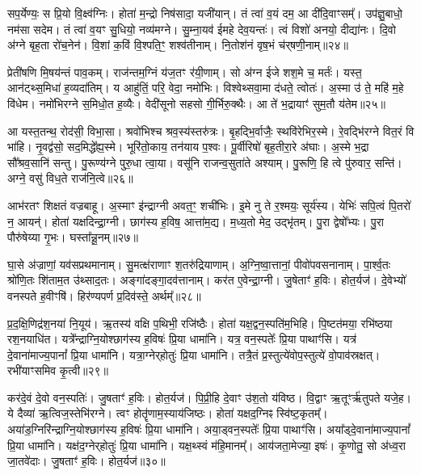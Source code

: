 सप॒र्येण्यः॒ स प्रि॒यो वि॒क्ष्व॑ग्निः।
होता॑ म॒न्द्रो निष॑सादा॒ यजी॑यान्।
तं त्वा॑ व॒यं दम॒ आ दी॑दि॒वाꣳसम्᳚।
उप॑ज्ञु॒बाधो॒ नम॑सा सदेम।
तं त्वा॑ व॒यꣳ सु॒धियो॒ नव्य॑मग्ने।
सु॒म्ना॒यव॑ ईमहे देव॒यन्तः॑।
त्वं विशो॑ अनयो॒ दीद्या॑नः।
दि॒वो अ॑ग्ने बृह॒ता रो॑च॒नेन॑।
वि॒शां क॒विं वि॒श्पति॒ꣳ॒ शश्व॑तीनाम्।
नि॒तोश॑नं वृष॒भं च॑र्‌\mbox{}षणी॒नाम्॥२४॥\ip

प्रेती॑षणि मि॒षय॑न्तं पाव॒कम्।
राज॑न्तम॒ग्निं य॑ज॒तꣳ र॑यी॒णाम्।
सो अ॑ग्न ईजे शश॒मे च॒ मर्तः॑।
यस्त॒ आन॑ट्थ्स॒मिधा॑ ह॒व्यदा॑तिम्।
य आहु॑तिं॒ परि॒ वेदा॒ नमो॑भिः।
विश्वेथ्सवा॒मा द॑धते॒ त्वोतः॑।
अ॒स्मा उ॑ ते॒ महि॑ म॒हे वि॑धेम।
नमो॑भिरग्ने स॒मिधो॒त ह॒व्यैः।
वेदी॑सूनो सहसो गी॒र्भिरु॒क्थैः।
आ ते॑ भ॒द्रायाꣳ॑ सुम॒तौ य॑तेम॥२५॥\ip

आ यस्त॒तन्थ॒ रोद॑सी॒ विभा॒सा।
श्रवो॑भिश्च श्रव॒स्य॑स्तरु॑त्रः।
बृ॒हद्भि॒र्वाजैः॒ स्थवि॑रेभिर॒स्मे।
रे॒वद्भि॑रग्ने वित॒रं वि भा॑हि।
नृ॒वद्व॑सो॒ सद॒मिद्धे᳚ह्य॒स्मे।
भूरि॑तो॒काय॒ तन॑याय प॒श्वः।
पू॒र्वीरिषो॑ बृह॒तीरा॒रे अ॑घाः।
अ॒स्मे भ॒द्रा सौ᳚श्रव॒सानि॑ सन्तु।
पु॒रूण्य॑ग्ने पुरु॒धा त्वा॒या।
वसू॑नि राजन्व॒सुता॑ते अश्याम्।
पु॒रूणि॒ हि त्वे पु॑रुवार॒ सन्ति॑।
अग्ने॒ वसु॑ विध॒ते राज॑नि॒त्वे॥२६॥\ip\anuvakamend[जा॒गृ॒वाꣳसो॒ अनु॑ग्म॒न्मानु॑षाणाञ्चर्‌\mbox{}षणी॒नां य॑तेमाश्या॒न्द्वे च॑]

आभ॑रतꣳ शिक्षतं वज्रबाहू।
अ॒स्माꣳ इ॑न्द्राग्नी अवत॒ꣳ॒ शची॑भिः।
इ॒मे नु ते र॒श्मयः॒ सूर्य॑स्य।
येभिः॑ सपि॒त्वं पि॒तरो॑ न॒ आयन्॑।
होता॑ यक्षदिन्द्रा॒ग्नी।
छाग॑स्य ह॒विष॒ आत्ता॑म॒द्य।
म॒ध्य॒तो मेद॒ उद्भृ॑तम्।
पु॒रा द्वेषो᳚भ्यः।
पु॒रा पौरु॑षेय्या गृ॒भः।
घस्ता᳚न्नू॒नम्॥२७॥\ip

घा॒से अ॑ज्राणां॒ यव॑सप्रथमानाम्।
सु॒मत्क्ष॑राणाꣳ श॒तरु॑द्रि\-याणाम्।
अ॒ग्नि॒ष्वा॒त्तानां॒ पीवो॑पवसनानाम्।
पा॒र्श्व॒तः श्रो॑णि॒तः शि॑ताम॒त उ॑थ्साद॒तः।
अङ्गा॑दङ्गा॒दव॑त्तानाम्।
कर॑त ए॒वेन्द्रा॒ग्नी।
जु॒षेताꣳ॑ ह॒विः।
होत॒र्यज॑।
दे॒वेभ्यो॑ वनस्पते ह॒वीꣳषि॑।
हिर॑ण्यपर्ण प्र॒दिव॑स्ते॒ अर्थम्᳚॥२८॥\ip

प्र॒द॒क्षि॒णिद्र॑श॒नया॑ नि॒यूय॑।
ऋ॒तस्य॑ वक्षि प॒थिभी॒ रजि॑ष्ठैः।
होता॑ यक्ष॒द्वन॒स्पति॑म॒भिहि।
पि॒ष्टत॑मया॒ रभि॑ष्ठया रश॒नयाधि॑त।
यत्रे᳚न्द्राग्नि॒योश्छाग॑स्य ह॒विषः॑ प्रि॒या धामा॑नि।
यत्र॒ वन॒स्पतेः᳚ प्रि॒या पाथाꣳ॑सि।
यत्र॑ दे॒वाना॑माज्य॒पानां᳚ प्रि॒या धामा॑नि।
यत्रा॒ग्नेर्‌\mbox{}होतुः॑ प्रि॒या धामा॑नि।
तत्रै॒तं प्र॒स्तुत्ये॑वोप॒स्तुत्ये॑ वो॒पाव॑स्रक्षत्।
रभी॑याꣳसमिव कृ॒त्वी॥२९॥\ip

कर॑दे॒वं दे॒वो वन॒स्पतिः॑।
जु॒षताꣳ॑ ह॒विः।
होत॒र्यज॑।
पि॒प्री॒हि दे॒वाꣳ उ॑श॒तो य॑विष्ठ।
वि॒द्वाꣳ ऋ॒तूꣳर्\mbox{}ऋ॑तुपते यजे॒ह।
ये दैव्या॑ ऋ॒त्विज॒स्तेभि॑रग्ने।
त्वꣳ होतॄ॑णाम॒स्याय॑जिष्ठः।
होता॑ यक्षद॒ग्निꣴ स्वि॑ष्ट॒कृतम्᳚।
अया॑ड॒ग्निरि॑न्द्राग्नि॒योश्छाग॑स्य ह॒विषः॑ प्रि॒या धामा॑नि।
अया॒ड्वन॒स्पतेः᳚ प्रि॒या पाथाꣳ॑सि।
अया᳚ड्दे॒वाना॑माज्य॒पानां᳚ प्रि॒या धामा॑नि।
यक्ष॑द॒ग्नेर्‌\mbox{}होतुः॑ प्रि॒या धामा॑नि।
यक्ष॒थ्स्वं म॑हि॒मानम्᳚।
आय॑जता॒मेज्या॒ इषः॑।
कृ॒णोतु॒ सो अ॑ध्व॒रा जा॒तवे॑दाः।
जु॒षताꣳ॑ ह॒विः।
होत॒र्यज॑॥३०॥\ip\anuvakamend[नू॒नमर्थं॑ कृ॒त्वी पाथाꣳ॑सि स॒प्त च॑]

